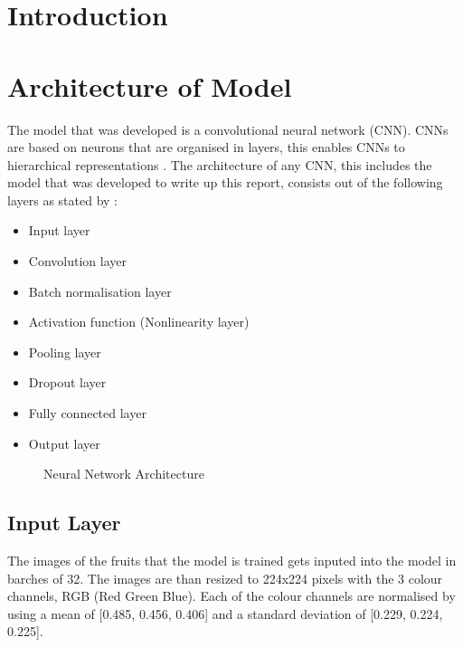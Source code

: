 \documentclass[a4paper,oneside,11pt]{book}
\begin{document}
\MakeTitle 
{} 
\tableofcontents
\cleardoublepage
\setcounter{page}{2}
\listoffigures
\cleardoublepage 
{} 

\pagestyle{plain}
\chapter[Introduction]{Introduction}

\chapter[Architecture of Model]{Architecture of Model}

The model that was developed is a convolutional neural network (CNN). CNNs are based on neurons that are organised in layers, this enables CNNs to hierarchical representations \citep{kattenborn2021review}. The architecture of any CNN, this includes the model that was developed to write up this report, consists out of the following layers as stated by \cite{bhatt2021cnn}: 
\begin{itemize}
    \item Input layer
    \item Convolution layer
    \item Batch normalisation layer
    \item Activation function (Nonlinearity layer)
    \item Pooling layer
    \item Dropout layer
    \item Fully connected layer
    \item Output layer
\end{itemize}

\begin{figure}[h]
    \centering
    \caption{Neural Network Architecture}
\end{figure}

\newpage
\section{Input Layer}

The images of the fruits that the model is trained gets inputed into the model in barches of 32. The images are than resized to 224x224 pixels with the 3 colour channels, RGB (Red Green Blue). Each of the colour channels are normalised by using a mean of [0.485, 0.456, 0.406] and a standard deviation of [0.229, 0.224, 0.225]. 
\end{document}
